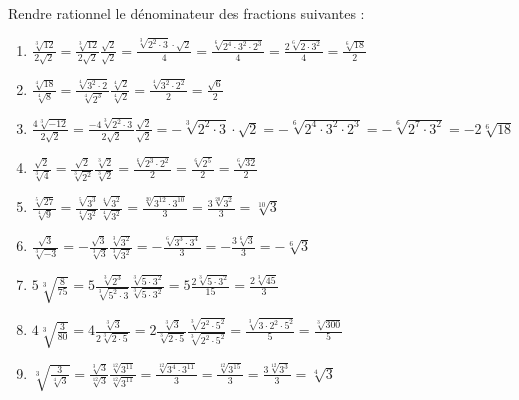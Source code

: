 \begin{solution}
Rendre rationnel le dénominateur des fractions suivantes :
\begin{enumerate}
\item $\frac{\sqrt[3]{12}}{2\sqrt{2}}=\frac{\sqrt[3]{12}}{2\sqrt{2}}\frac{\sqrt{2}}{\sqrt{2}}=\frac{\sqrt[3]{{{2}^{2}}\cdot 3}\cdot \sqrt{2}}{4}=\frac{\sqrt[6]{{{2}^{4}}\cdot {{3}^{2}}\cdot {{2}^{3}}}}{4}=\frac{2\sqrt[6]{2\cdot {{3}^{2}}}}{4}=\frac{\sqrt[6]{18}}{2}$	
\item $\frac{\sqrt[4]{18}}{\sqrt[4]{8}}=\frac{\sqrt[4]{{{3}^{2}}\cdot 2}}{\sqrt[4]{{{2}^{3}}}}\frac{\sqrt[4]{2}}{\sqrt[4]{2}}=\frac{\sqrt[4]{{{3}^{2}}\cdot {{2}^{2}}}}{2}=\frac{\sqrt{6}}{2}$
\item $\frac{4\sqrt[3]{-12}}{2\sqrt{2}}=\frac{-4\sqrt[3]{{{2}^{2}}\cdot 3}}{2\sqrt{2}}\frac{\sqrt{2}}{\sqrt{2}}=-\sqrt[3]{{{2}^{2}}\cdot 3}\cdot \sqrt{2}=-\sqrt[6]{{{2}^{4}}\cdot {{3}^{2}}\cdot {{2}^{3}}}=-\sqrt[6]{{{2}^{7}}\cdot {{3}^{2}}}=-2\sqrt[6]{18}$
\item $\frac{\sqrt{2}}{\sqrt[3]{4}}=\frac{\sqrt{2}}{\sqrt[3]{{{2}^{2}}}}\frac{\sqrt[3]{2}}{\sqrt[3]{2}}=\frac{\sqrt[6]{{{2}^{3}}\cdot {{2}^{2}}}}{2}=\frac{\sqrt[6]{{{2}^{5}}}}{2}=\frac{\sqrt[6]{32}}{2}$
\item $\frac{\sqrt[5]{27}}{\sqrt[4]{9}}=\frac{\sqrt[5]{{{3}^{3}}}}{\sqrt[4]{{{3}^{2}}}}\frac{\sqrt[4]{{{3}^{2}}}}{\sqrt[4]{{{3}^{2}}}}=\frac{\sqrt[20]{{{3}^{12}}\cdot {{3}^{10}}}}{3}=\frac{3\sqrt[20]{{{3}^{2}}}}{3}=\sqrt[10]{3}$
\item $\frac{\sqrt{3}}{\sqrt[3]{-3}}=-\frac{\sqrt{3}}{\sqrt[3]{3}}\frac{\sqrt[3]{{{3}^{2}}}}{\sqrt[3]{{{3}^{2}}}}=-\frac{\sqrt[6]{{{3}^{3}}\cdot {{3}^{4}}}}{3}=-\frac{3\sqrt[6]{3}}{3}=-\sqrt[6]{3}$
\item $5\sqrt[3]{\frac{8}{75}}=5\frac{\sqrt[3]{{{2}^{3}}}}{\sqrt[3]{{{5}^{2}}\cdot 3}}\frac{\sqrt[3]{5\cdot {{3}^{2}}}}{\sqrt[3]{5\cdot {{3}^{2}}}}=5\frac{2\sqrt[3]{5\cdot {{3}^{2}}}}{15}=\frac{2\sqrt[3]{45}}{3}$
\item $4\sqrt[3]{\frac{3}{80}}=4\frac{\sqrt[3]{3}}{2\sqrt[3]{2\cdot 5}}=2\frac{\sqrt[3]{3}}{\sqrt[3]{2\cdot 5}}\frac{\sqrt[3]{{{2}^{2}}\cdot {{5}^{2}}}}{\sqrt[3]{{{2}^{2}}\cdot {{5}^{2}}}}=\frac{\sqrt[3]{3\cdot {{2}^{2}}\cdot {{5}^{2}}}}{5}=\frac{\sqrt[3]{300}}{5}$
\item $\sqrt[3]{\frac{3}{\sqrt[4]{3}}}=\frac{\sqrt[3]{3}}{\sqrt[12]{3}}\frac{\sqrt[12]{{{3}^{11}}}}{\sqrt[12]{{{3}^{11}}}}=\frac{\sqrt[12]{{{3}^{4}}\cdot {{3}^{11}}}}{3}=\frac{\sqrt[12]{{{3}^{15}}}}{3}=\frac{3\sqrt[12]{{{3}^{3}}}}{3}=\sqrt[4]{3}$
\end{enumerate}
\end{solution}
